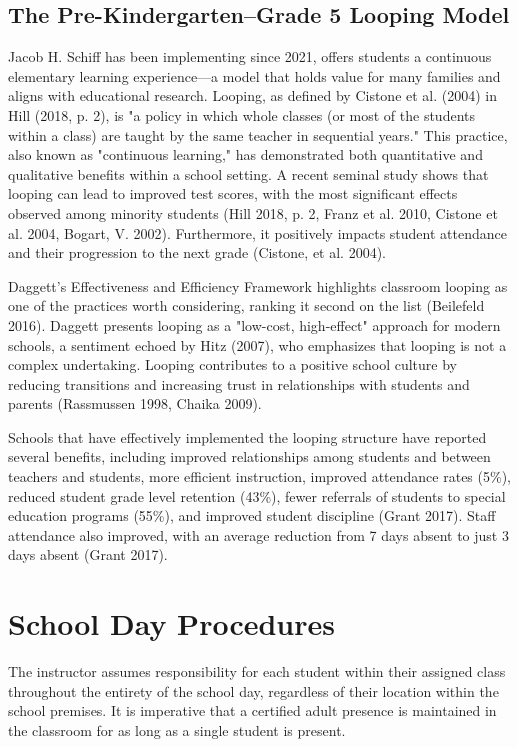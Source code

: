 \documentclass[11pt, letterpaper]{article}
\begin{document}
\subsection{The Pre-Kindergarten–Grade 5 Looping Model}
Jacob H. Schiff has been implementing since 2021, offers students a continuous elementary learning experience—a model that holds value for many families and aligns with educational research. Looping, as defined by Cistone et al. (2004) in Hill (2018, p. 2), is "a policy in which whole classes (or most of the students within a class) are taught by the same teacher in sequential years." This practice, also known as "continuous learning," has demonstrated both quantitative and qualitative benefits within a school setting. A recent seminal study shows that looping can lead to improved test scores, with the most significant effects observed among minority students (Hill 2018, p. 2, Franz et al. 2010, Cistone et al. 2004, Bogart, V. 2002). Furthermore, it positively impacts student attendance and their progression to the next grade (Cistone, et al. 2004).

Daggett's Effectiveness and Efficiency Framework highlights classroom looping as one of the practices worth considering, ranking it second on the list (Beilefeld 2016). Daggett presents looping as a "low-cost, high-effect" approach for modern schools, a sentiment echoed by Hitz (2007), who emphasizes that looping is not a complex undertaking. Looping contributes to a positive school culture by reducing transitions and increasing trust in relationships with students and parents (Rassmussen 1998, Chaika 2009).

Schools that have effectively implemented the looping structure have reported several benefits, including improved relationships among students and between teachers and students, more efficient instruction, improved attendance rates (5\%), reduced student grade level retention (43\%), fewer referrals of students to special education programs (55\%), and improved student discipline (Grant 2017). Staff attendance also improved, with an average reduction from 7 days absent to just 3 days absent (Grant 2017).
\section{School Day Procedures}
The instructor assumes responsibility for each student within their assigned class throughout the entirety of the school day, regardless of their location within the school premises. It is imperative that a certified adult presence is maintained in the classroom for as long as a single student is present.
\end{document}

